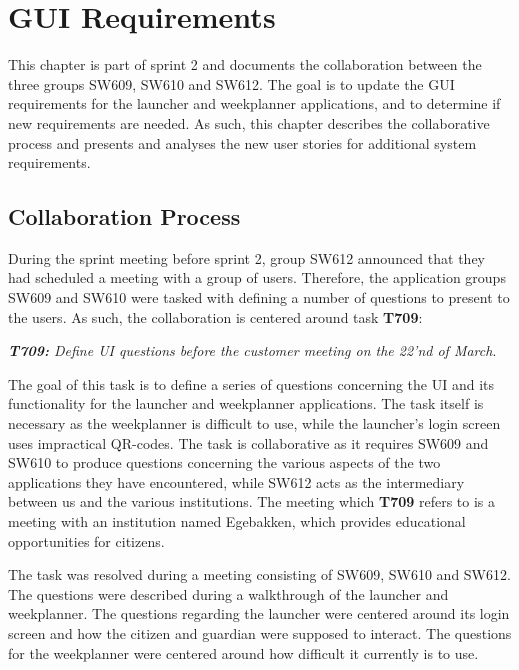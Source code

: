 \chapter{GUI Requirements}\label{sec:Colab2}
This chapter is part of sprint 2 and documents the collaboration between the
three groups SW609, SW610 and SW612. The goal is to update the GUI requirements
for the launcher and weekplanner applications, and to determine if new
requirements are needed. As such, this chapter describes the collaborative
process and presents and analyses the new user stories for additional system
requirements.

\section{Collaboration Process}
During the sprint meeting before sprint 2, group SW612 announced that they had
scheduled a meeting with a group of users. Therefore, the application groups
SW609 and SW610 were tasked with defining a number of questions to present to
the users. As such, the collaboration is centered around task \textbf{T709}:\nl

\textit{\textbf{T709:} Define UI questions before the customer meeting on the
22'nd of March}.\nl 

The goal of this task is to define a series of questions concerning
the UI and its functionality for the launcher and weekplanner applications. The task itself is necessary as the
weekplanner is difficult to use, while the launcher's login screen uses 
impractical QR-codes. The task is collaborative as it requires SW609 and SW610
to produce questions concerning the various aspects of the two applications they have
encountered, while SW612 acts as the intermediary between us and the various
institutions. The meeting which \textbf{T709} refers to is a meeting with an
institution named Egebakken, which provides educational opportunities for
citizens.\nl

The task was resolved during a meeting consisting of SW609, SW610 and SW612.
The questions were described during a walkthrough of the launcher and
weekplanner. The questions regarding the launcher were centered around its
login screen and how the citizen and guardian were supposed to interact. The
questions for the weekplanner were centered around how difficult it currently
is to use.\nl

